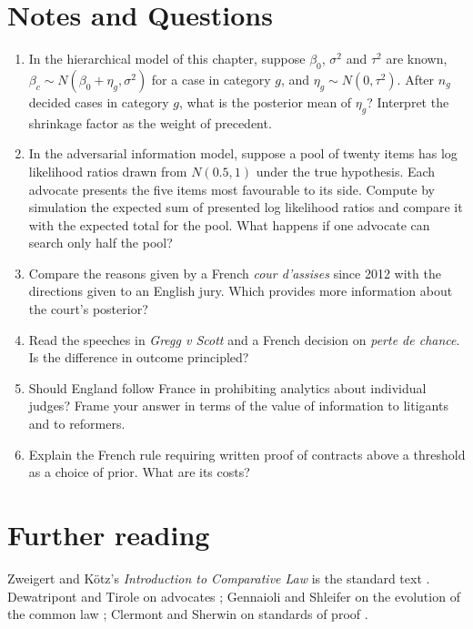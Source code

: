 \section*{Notes and Questions}
\begin{enumerate}[label=\arabic*.]
\item In the hierarchical model of this chapter, suppose $\beta_0$, $\sigma^2$ and $\tau^2$ are known, $\beta_c \sim N(\beta_0 + \eta_g, \sigma^2)$ for a case in category $g$, and $\eta_g \sim N(0,\tau^2)$. After $n_g$ decided cases in category $g$, what is the posterior mean of $\eta_g$? Interpret the shrinkage factor as the weight of precedent.
\item In the adversarial information model, suppose a pool of twenty items has log likelihood ratios drawn from $N(0.5, 1)$ under the true hypothesis. Each advocate presents the five items most favourable to its side. Compute by simulation the expected sum of presented log likelihood ratios and compare it with the expected total for the pool. What happens if one advocate can search only half the pool?
\item Compare the reasons given by a French \emph{cour d'assises} since 2012 with the directions given to an English jury. Which provides more information about the court's posterior?
\item Read the speeches in \emph{Gregg v Scott} and a French decision on \emph{perte de chance}. Is the difference in outcome principled?
\item Should England follow France in prohibiting analytics about individual judges? Frame your answer in terms of the value of information to litigants and to reformers.
\item Explain the French rule requiring written proof of contracts above a threshold as a choice of prior. What are its costs?
\end{enumerate}

\section*{Further reading}
Zweigert and K\"otz's \emph{Introduction to Comparative Law} is the standard text \citep{zweigert1998}. Dewatripont and Tirole on advocates \citep{dewatripont1999}; Gennaioli and Shleifer on the evolution of the common law \citep{gennaioli2007}; Clermont and Sherwin on standards of proof \citep{clermont2002}.
